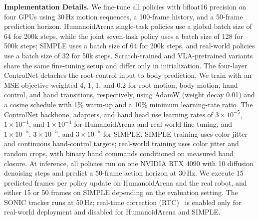 \textbf{Implementation Details.} We fine-tune all policies with bfloat16 precision on four GPUs using 30\,Hz motion sequences, a 100-frame history, and a 50-frame prediction horizon. HumanoidArena single-task policies use a global batch size of 64 for 200k steps, while the joint seven-task policy uses a batch size of 128 for 500k steps; SIMPLE uses a batch size of 64 for 200k steps, and real-world policies use a batch size of 32 for 50k steps. Scratch-trained and VLA-pretrained variants share the same fine-tuning setup and differ only in initialization. The four-layer ControlNet detaches the root-control input to body prediction. We train with an MSE objective weighted 4, 1, 1, and 0.2 for root motion, body motion, hand control, and hand transitions, respectively, using AdamW (weight decay 0.01) and a cosine schedule with 1\% warm-up and a 10\% minimum learning-rate ratio. The ControlNet backbone, adapters, and hand head use learning rates of $3\times10^{-5}$, $1\times10^{-4}$, and $1\times10^{-4}$ for HumanoidArena and real-world fine-tuning, and $1\times10^{-5}$, $3\times10^{-5}$, and $3\times10^{-5}$ for SIMPLE. SIMPLE training uses color jitter and continuous hand-control targets; real-world training uses color jitter and random crops, with binary hand commands conditioned on measured hand closure. At inference, all policies run on one NVIDIA RTX 4090 with 10 diffusion denoising steps and predict a 50-frame action horizon at 30\,Hz. We execute 15 predicted frames per policy update on HumanoidArena and the real robot, and either 15 or 50 frames on SIMPLE depending on the evaluation setting. The SONIC tracker runs at 50\,Hz; real-time correction (RTC)~\cite{rtc} is enabled only for real-world deployment and disabled for HumanoidArena and SIMPLE.
